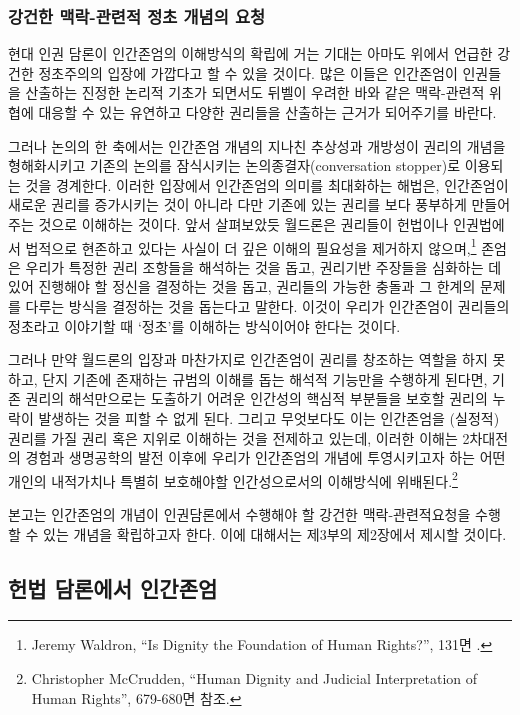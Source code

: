 \subsubsection{강건한 맥락-관련적 정초 개념의 요청}

현대 인권 담론이 인간존엄의 이해방식의 확립에 거는 기대는 아마도 위에서 언급한 강건한 정초주의의 입장에 가깝다고 할 수 있을 것이다. 많은 이들은 인간존엄이 인권들을 산출하는 진정한 논리적 기초가 되면서도 뒤벨이 우려한 바와 같은 맥락-관련적 위협에 대응할 수 있는 유연하고 다양한 권리들을 산출하는 근거가 되어주기를 바란다.

그러나 논의의 한 축에서는 인간존엄 개념의 지나친 추상성과 개방성이 권리의 개념을 형해화시키고 기존의 논의를 잠식시키는 논의종결자(conversation stopper)로 이용되는 것을 경계한다. 이러한 입장에서 인간존엄의 의미를 최대화하는 해법은, 인간존엄이 새로운 권리를 증가시키는 것이 아니라 다만 기존에 있는 권리를 보다 풍부하게 만들어 주는 것으로 이해하는 것이다. 앞서 살펴보았듯 월드론은 권리들이 헌법이나 인권법에서 법적으로 현존하고 있다는 사실이 더 깊은 이해의 필요성을 제거하지 않으며,\footnote{Jeremy Waldron, ``Is Dignity the Foundation of Human Rights?'', 131면 .} 존엄은 우리가 특정한 권리 조항들을 해석하는 것을 돕고, 권리기반 주장들을 심화하는 데 있어 진행해야 할 정신을 결정하는 것을 돕고, 권리들의 가능한 충돌과 그 한계의 문제를 다루는 방식을 결정하는 것을 돕는다고 말한다. 이것이 우리가 인간존엄이 권리들의 정초라고 이야기할 때 `정초'를 이해하는 방식이어야 한다는 것이다.

그러나 만약 월드론의 입장과 마찬가지로 인간존엄이 권리를 창조하는 역할을 하지 못하고, 단지 기존에 존재하는 규범의 이해를 돕는 해석적 기능만을 수행하게 된다면, 기존 권리의 해석만으로는 도출하기 어려운 인간성의 핵심적 부분들을 보호할 권리의 누락이 발생하는 것을 피할 수 없게 된다. 그리고 무엇보다도 이는 인간존엄을 (실정적) 권리를 가질 권리 혹은 지위로 이해하는 것을 전제하고 있는데, 이러한 이해는 2차대전의 경험과 생명공학의 발전 이후에 우리가 인간존엄의 개념에 투영시키고자 하는 어떤 개인의 내적가치나 특별히 보호해야할 인간성으로서의 이해방식에 위배된다.\footnote{Christopher McCrudden, ``Human Dignity and Judicial Interpretation of Human Rights'', 679-680면 참조.}

본고는 인간존엄의 개념이 인권담론에서 수행해야 할 강건한 맥락-관련적요청을 수행할 수 있는 개념을 확립하고자 한다. 이에 대해서는 제3부의 제2장에서 제시할 것이다.

\subsection{헌법 담론에서 인간존엄}

